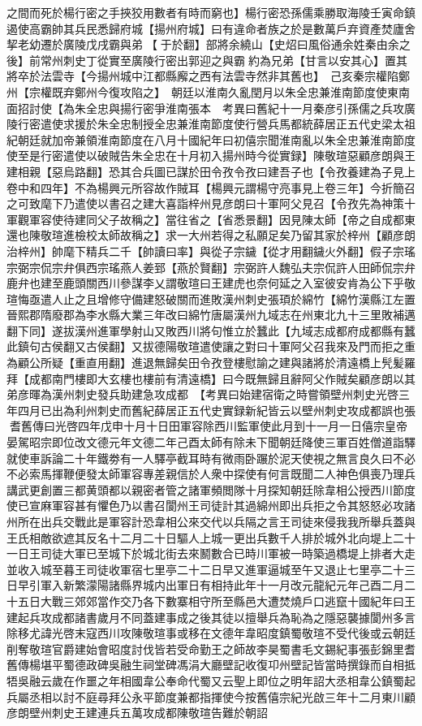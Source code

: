 之間而死於楊行密之手挾狡用數者有時而窮也】楊行密恐孫儒乘勝取海陵壬寅命鎮遏使高霸帥其兵民悉歸府城【揚州府城】曰有違命者族之於是數萬戶弃資產焚廬舍挈老幼遷於廣陵戊戌霸與弟【于於翻】部將余繞山【史炤曰風俗通余姓秦由余之後】前常州刺史丁從實至廣陵行密出郭迎之與霸約為兄弟【甘言以安其心】置其將卒於法雲寺【今揚州城中江都縣廨之西有法雲寺然非其舊也】　己亥秦宗權陷鄭州【宗權既弃鄭州今復攻陷之】　朝廷以淮南久亂閏月以朱全忠兼淮南節度使東南面招討使【為朱全忠與揚行密爭淮南張本　考異曰舊紀十一月秦彦引孫儒之兵攻廣陵行密遣使求援於朱全忠制授全忠兼淮南節度使行營兵馬都統薛居正五代史梁太祖紀朝廷就加帝兼領淮南節度在八月十國紀年曰初僖宗聞淮南亂以朱全忠兼淮南節度使至是行密遣使以破賊告朱全忠在十月初入揚州時今從實録】陳敬瑄惡顧彦朗與王建相親【惡烏路翻】恐其合兵圖已謀於田令孜令孜曰建吾子也【令孜養建為子見上卷中和四年】不為楊興元所容故作賊耳【楊興元謂楊守亮事見上卷三年】今折簡召之可致麾下乃遣使以書召之建大喜詣梓州見彦朗曰十軍阿父見召【令孜先為神策十軍觀軍容使待建同父子故稱之】當往省之【省悉景翻】因見陳太師【帝之自成都東還也陳敬瑄進檢校太師故稱之】求一大州若得之私願足矣乃留其家於梓州【顧彦朗治梓州】帥麾下精兵二千【帥讀曰率】與從子宗鐬【從才用翻鐬火外翻】假子宗瑤宗弼宗侃宗弁俱西宗瑤燕人姜郅【燕於賢翻】宗弼許人魏弘夫宗侃許人田師侃宗弁鹿弁也建至鹿頭關西川參謀李乂謂敬瑄曰王建虎也奈何延之入室彼安肯為公下乎敬瑄悔亟遣人止之且增修守備建怒破關而進敗漢州刺史張頊於綿竹【綿竹漢縣江左置晉熙郡隋廢郡為李水縣大業三年改曰綿竹唐屬漢州九域志在州東北九十三里敗補邁翻下同】遂拔漢州進軍學射山又敗西川將句惟立於蠶此【九域志成都府成都縣有蠶此鎮句古侯翻又古侯翻】又拔德陽敬瑄遣使讓之對曰十軍阿父召我來及門而拒之重為顧公所疑【重直用翻】進退無歸矣田令孜登樓慰諭之建與諸將於清遠橋上髠髪羅拜【成都南門樓即大玄樓也樓前有清遠橋】曰今既無歸且辭阿父作賊矣顧彦朗以其弟彦暉為漢州刺史發兵助建急攻成都　【考異曰始建宿衛之時嘗領壁州刺史光啓三年四月已出為利州刺史而舊紀薛居正五代史實録新紀皆云以壁州刺史攻成都誤也張耆舊傳曰光啓四年戊申十月十日田軍容除西川監軍使此月到十一月一日僖宗皇帝晏駕昭宗即位改文德元年文德二年己酉太師有除未下聞朝廷降使三軍百姓僧道詣驛就使車訴論二十年鐵劵有一人驛亭截耳時有微雨卧蹍於泥天使視之無言良久曰不必不必索馬揮鞭便發太師軍容專差親信於人衆中探使有何言既聞二人神色俱喪乃理兵講武更創置三都黄頭都以親密者管之諸軍頻閲隊十月探知朝廷除韋相公授西川節度使已宣麻軍容甚有懼色乃以書召閬州王司徒計其過綿州即出兵拒之令其怒怒必攻諸州所在出兵交戰此是軍容計恐韋相公來交代以兵隔之言王司徒來侵我我所舉兵蓋與王氏相敵欲遮其反名十二月二十日驅人上城一更出兵數千人排於城外北向堤上二十一日王司徒大軍已至城下於城北街去來鬭數合已時川軍被一時築過橋堤上排者大走並收入城至暮王司徒收軍宿七里亭二十二日早又進軍逼城至午又退止七里亭二十三日早引軍入新繁濛陽諸縣界城内出軍日有相持此年十一月改元龍紀元年己酉二月二十五日大戰三郊郊當作交乃各下數寨相守所至縣邑大遭焚燒戶口逃竄十國紀年曰王建起兵攻成都諸書歲月不同蓋建事成之後其徒以擅舉兵為恥為之隱惡襲據閬州多言除移尤諱光啓末寇西川攻陳敬瑄事或移在文德年韋昭度鎮蜀敬瑄不受代後或云朝廷削奪敬瑄官爵建始會昭度討伐皆若受命勤王之師故李昊蜀書毛文錫紀事張彭錦里耆舊傳楊堪平蜀德政碑吳融生祠堂碑馮涓大廳壁記收復卭州壁記皆當時撰錄而自相抵牾吳融云歲在作噩之年相國韋公奉命代蜀又云聖上即位之明年詔大丞相韋公鎮蜀起兵屬丞相以討不庭尋拜公永平節度兼都指揮使今按舊僖宗紀光啟三年十二月東川顧彦朗壁州刺史王建連兵五萬攻成都陳敬瑄告難於朝詔